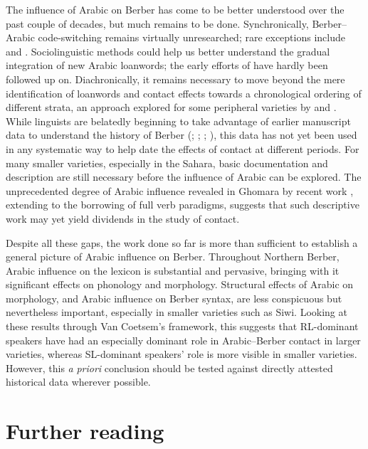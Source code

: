 \documentclass[output=paper]{langsci/langscibook}
\begin{document}
The influence of Arabic on Berber has come to be better understood over the past couple of decades, but much remains to be done.  Synchronically, Berber–Arabic code-switching remains virtually unresearched; rare exceptions include \citet{Hamza2007} and \citet{Kossmann2012}. Sociolinguistic methods could help us better understand the gradual integration of new Arabic loanwords; the early efforts of \citet{Brahimi2000} have hardly been followed up on. Diachronically, it remains necessary to move beyond the mere identification of loanwords and contact effects towards a chronological ordering of different strata, an approach explored for some peripheral varieties by \citet{Souag2009} and \citet{vanPuttenBenkato2017}. While linguists are belatedly beginning to take advantage of earlier manuscript data to understand the history of Berber (\citealt{Boogert1997}; \citealt{Boogert1998}; \citealt{Brugnatelli2011}; \citealt{Meouak2015}), this data has not yet been used in any systematic way to help date the effects of contact at different periods. For many smaller varieties, especially in the Sahara, basic documentation and description are still necessary before the influence of Arabic can be explored. The unprecedented degree of Arabic influence revealed in Ghomara by recent work \citep{Mourigh2016}, extending to the borrowing of full verb paradigms, suggests that such descriptive work may yet yield dividends in the study of contact.

Despite all these gaps, the work done so far is more than sufficient to establish a general picture of Arabic influence on Berber. Throughout Northern Berber, Arabic influence on the lexicon is substantial and pervasive, bringing with it significant effects on phonology and morphology. Structural effects of Arabic on morphology, and Arabic influence on Berber syntax, are less conspicuous but nevertheless important, especially in smaller varieties such as Siwi. Looking at these results through Van Coetsem's framework, this suggests that RL-dominant speakers have had an especially dominant role in Arabic–Berber contact in larger varieties, whereas SL-dominant speakers' role is more visible in smaller varieties.  However, this \textit{a} \textit{priori} conclusion should be tested against directly attested historical data wherever possible.

\section*{Further reading}
\end{document}
